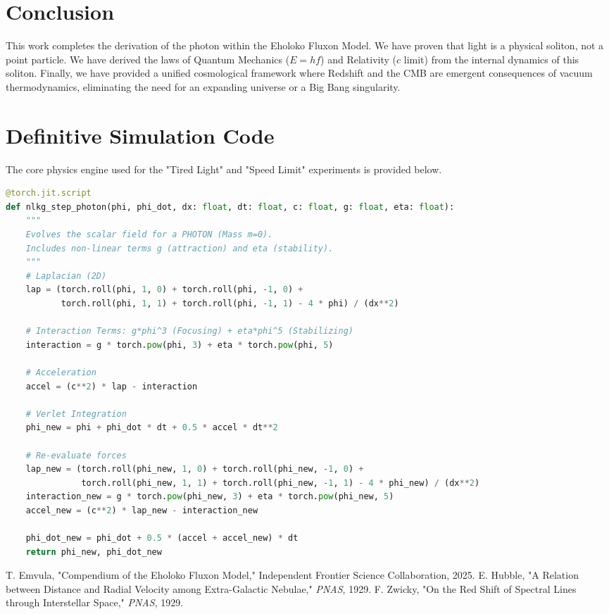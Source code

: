 \documentclass[11pt, twoside]{article}
\begin{document}
\section{Conclusion}
This work completes the derivation of the photon within the Eholoko Fluxon Model. We have proven that light is a physical soliton, not a point particle. We have derived the laws of Quantum Mechanics ($E=hf$) and Relativity ($c$ limit) from the internal dynamics of this soliton. Finally, we have provided a unified cosmological framework where Redshift and the CMB are emergent consequences of vacuum thermodynamics, eliminating the need for an expanding universe or a Big Bang singularity.

\newpage
\appendix
\section{Definitive Simulation Code}
The core physics engine used for the "Tired Light" and "Speed Limit" experiments is provided below.

\begin{lstlisting}[language=Python, caption=The Corrected JIT Physics Engine for Photon Solitons]
@torch.jit.script
def nlkg_step_photon(phi, phi_dot, dx: float, dt: float, c: float, g: float, eta: float):
    """
    Evolves the scalar field for a PHOTON (Mass m=0).
    Includes non-linear terms g (attraction) and eta (stability).
    """
    # Laplacian (2D)
    lap = (torch.roll(phi, 1, 0) + torch.roll(phi, -1, 0) +
           torch.roll(phi, 1, 1) + torch.roll(phi, -1, 1) - 4 * phi) / (dx**2)
    
    # Interaction Terms: g*phi^3 (Focusing) + eta*phi^5 (Stabilizing)
    interaction = g * torch.pow(phi, 3) + eta * torch.pow(phi, 5)
    
    # Acceleration
    accel = (c**2) * lap - interaction
    
    # Verlet Integration
    phi_new = phi + phi_dot * dt + 0.5 * accel * dt**2
    
    # Re-evaluate forces
    lap_new = (torch.roll(phi_new, 1, 0) + torch.roll(phi_new, -1, 0) +
               torch.roll(phi_new, 1, 1) + torch.roll(phi_new, -1, 1) - 4 * phi_new) / (dx**2)
    interaction_new = g * torch.pow(phi_new, 3) + eta * torch.pow(phi_new, 5)
    accel_new = (c**2) * lap_new - interaction_new
    
    phi_dot_new = phi_dot + 0.5 * (accel + accel_new) * dt
    return phi_new, phi_dot_new
\end{lstlisting}


\begin{thebibliography}{9}
 T. Emvula, "Compendium of the Eholoko Fluxon Model," Independent Frontier Science Collaboration, 2025.
 E. Hubble, "A Relation between Distance and Radial Velocity among Extra-Galactic Nebulae," \textit{PNAS}, 1929.
 F. Zwicky, "On the Red Shift of Spectral Lines through Interstellar Space," \textit{PNAS}, 1929.
\end{thebibliography}
\end{document}
